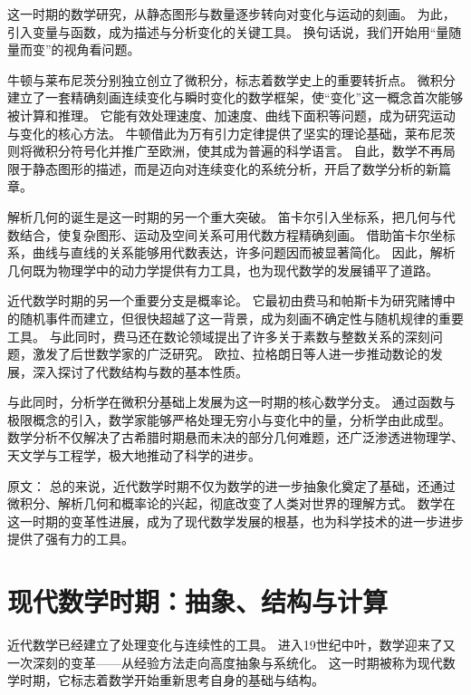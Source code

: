 这一时期的数学研究，从静态图形与数量逐步转向对变化与运动的刻画。  
为此，引入变量与函数，成为描述与分析变化的关键工具。  
换句话说，我们开始用“量随量而变”的视角看问题。




牛顿与莱布尼茨分别独立创立了微积分，标志着数学史上的重要转折点。  
微积分建立了一套精确刻画连续变化与瞬时变化的数学框架，使“变化”这一概念首次能够被计算和推理。  
它能有效处理速度、加速度、曲线下面积等问题，成为研究运动与变化的核心方法。  
牛顿借此为万有引力定律提供了坚实的理论基础，莱布尼茨则将微积分符号化并推广至欧洲，使其成为普遍的科学语言。   
自此，数学不再局限于静态图形的描述，而是迈向对连续变化的系统分析，开启了数学分析的新篇章。




解析几何的诞生是这一时期的另一个重大突破。  
笛卡尔引入坐标系，把几何与代数结合，使复杂图形、运动及空间关系可用代数方程精确刻画。  
借助笛卡尔坐标系，曲线与直线的关系能够用代数表达，许多问题因而被显著简化。  
因此，解析几何既为物理学中的动力学提供有力工具，也为现代数学的发展铺平了道路。


近代数学时期的另一个重要分支是概率论。  
它最初由费马和帕斯卡为研究赌博中的随机事件而建立，但很快超越了这一背景，成为刻画不确定性与随机规律的重要工具。  
与此同时，费马还在数论领域提出了许多关于素数与整数关系的深刻问题，激发了后世数学家的广泛研究。  
欧拉、拉格朗日等人进一步推动数论的发展，深入探讨了代数结构与数的基本性质。









与此同时，分析学在微积分基础上发展为这一时期的核心数学分支。  
通过函数与极限概念的引入，数学家能够严格处理无穷小与变化中的量，分析学由此成型。  
数学分析不仅解决了古希腊时期悬而未决的部分几何难题，还广泛渗透进物理学、天文学与工程学，极大地推动了科学的进步。


原文：
总的来说，近代数学时期不仅为数学的进一步抽象化奠定了基础，还通过微积分、解析几何和概率论的兴起，彻底改变了人类对世界的理解方式。
数学在这一时期的变革性进展，成为了现代数学发展的根基，也为科学技术的进一步进步提供了强有力的工具。


\section{现代数学时期：抽象、结构与计算}


近代数学已经建立了处理变化与连续性的工具。  
进入19世纪中叶，数学迎来了又一次深刻的变革——从经验方法走向高度抽象与系统化。  
这一时期被称为现代数学时期，它标志着数学开始重新思考自身的基础与结构。




